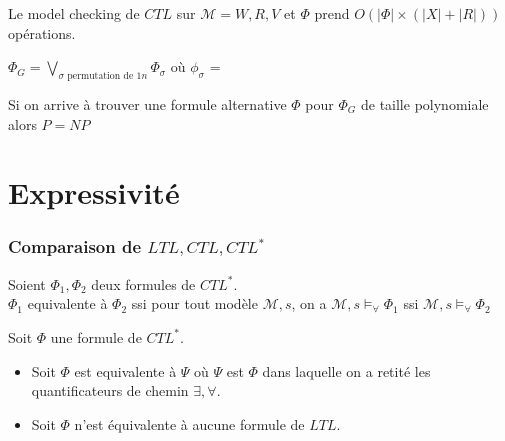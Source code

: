 \documentclass[10pt,a4paper]{article}
\newcommand{\M}{\mathcal{M}}
\begin{document}
\begin{thm}
 Le model checking de $CTL$ sur $\M = W,R,V$ et $\Phi$ prend $O(|\Phi|  \times ( | X| + |R|))$ opérations.
\end{thm}

\begin{ex}
 $\Phi_G = \bigvee_{\sigma\text{ permutation de }1 n} \Phi_\sigma$
où $\phi_{\sigma}$ = 
\end{ex}




\begin{thm}
 Si on arrive à trouver une formule alternative $\Phi$ pour $\Phi_G$ de taille polynomiale alors $P = NP$
\end{thm}

\part{Expressivité}

\section{Comparaison de $LTL, CTL, CTL^*$}

\begin{definition}
 Soient $\Phi_1, \Phi_2$ deux formules de $CTL^*$.\\
$\Phi_1$ equivalente à $\Phi_2$ ssi pour tout modèle $\M,s$, on a 
	    $\M,s \models_\forall \Phi_1$ ssi $\M,s \models_\forall \Phi_2$

\end{definition}

\begin{thm}
 Soit $\Phi$ une formule de $CTL^*$.
\begin{itemize}
 \item Soit $\Phi$ est equivalente à $\Psi$ où $\Psi$ est $\Phi$ dans laquelle on a retité les quantificateurs de chemin $\exists, \forall$.
 \item Soit $\Phi$ n'est équivalente à aucune formule de $LTL$.
\end{itemize}

\end{thm}
\end{document}

